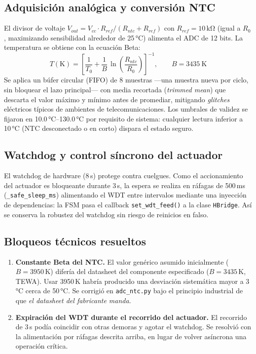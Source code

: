 \documentclass[11pt,letterpaper]{article}
\begin{document}
\subsection{Adquisición analógica y conversión NTC}
El divisor de voltaje $V_{out} = V_{cc} \cdot R_{ref}/(R_{ntc}+R_{ref})$ con
$R_{ref}=10\,\mathrm{k\Omega}$ (igual a $R_0$, maximizando sensibilidad alrededor de
25\,°C) alimenta el ADC de 12 bits. La temperatura se obtiene con la ecuación Beta:
\begin{equation}
T(\mathrm{K}) = \left[ \frac{1}{T_0} + \frac{1}{B}\,\ln\!\left(\frac{R_{ntc}}{R_0}\right) \right]^{-1},
\qquad B = 3435\ \mathrm{K}
\end{equation}
Se aplica un búfer circular (FIFO) de 8 muestras ---una muestra nueva por ciclo, sin
bloquear el lazo principal--- con media recortada (\emph{trimmed mean}) que descarta el
valor máximo y mínimo antes de promediar, mitigando \emph{glitches} eléctricos típicos
de ambientes de telecomunicaciones. Los umbrales de validez se fijaron en
10.0\,°C--130.0\,°C por requisito de sistema: cualquier lectura inferior a 10\,°C
(NTC desconectado o en corto) dispara el estado seguro.

\subsection{Watchdog y control síncrono del actuador}
El watchdog de hardware (8\,s) protege contra cuelgues. Como el accionamiento del
actuador es bloqueante durante 3\,s, la espera se realiza en ráfagas de 500\,ms
(\texttt{\_safe\_sleep\_ms}) alimentando el WDT entre intervalos mediante una inyección
de dependencias: la FSM pasa el callback \texttt{set\_wdt\_feed()} a la clase
\texttt{HBridge}. Así se conserva la robustez del watchdog sin riesgo de reinicios en
falso.

\subsection{Bloqueos técnicos resueltos}
\begin{enumerate}
  \item \textbf{Constante Beta del NTC.} El valor genérico asumido inicialmente ($B=3950$\,K) difería del datasheet del componente especificado ($B=3435$\,K, TEWA). Usar 3950\,K habría producido una desviación sistemática mayor a 3\,°C cerca de 50\,°C. Se corrigió en \texttt{adc\_ntc.py} bajo el principio industrial de que \emph{el datasheet del fabricante manda}.
  \item \textbf{Expiración del WDT durante el recorrido del actuador.} El recorrido de 3\,s podía coincidir con otras demoras y agotar el watchdog. Se resolvió con la alimentación por ráfagas descrita arriba, en lugar de volver asíncrona una operación crítica.
\end{enumerate}
\end{document}
